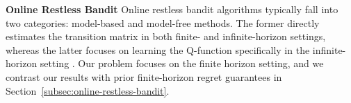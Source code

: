 
\textbf{Online Restless Bandit\;\;} 
Online restless bandit algorithms typically fall into two categories: model-based and model-free methods. The former directly estimates the transition matrix in both finite-\citep{jung2019regret,wang2023optimistic,liang2024bayesian} and infinite-horizon \citep{10.1007/978-3-642-34106-9_19, wang2020restless, xiong2022learning,xiong2022reinforcement, akbarzadeh2023learning} settings, whereas the latter focuses on learning the Q-function specifically in the infinite-horizon setting \citep{killian2021q, xiong2023finite,xiong2024whittle, kakarapalli2024faster}.
Our problem focuses on the finite horizon setting, and we contrast our results with prior finite-horizon regret guarantees in Section~\ref{subsec:online-restless-bandit}.


